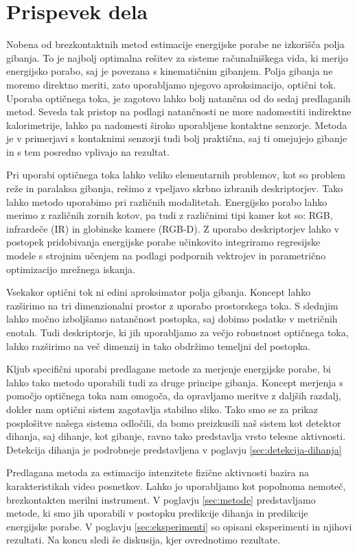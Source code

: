 \section{Prispevek dela}
Nobena od brezkontaktnih metod estimacije energijske porabe ne izkorišča polja gibanja. To je najbolj optimalna rešitev za sisteme računalniškega vida, ki merijo energijsko porabo, saj je povezana s kinematičnim gibanjem. Polja gibanja ne moremo direktno meriti, zato uporabljamo njegovo aproksimacijo, optični tok. Uporaba optičnega toka, je zagotovo lahko bolj natančna od do sedaj predlaganih metod. Seveda tak pristop na podlagi natančnosti ne more nadomestiti indirektne kalorimetrije, lahko pa nadomesti široko uporabljene kontaktne senzorje. Metoda je v primerjavi s kontaknimi senzorji tudi bolj praktična, saj ti omejujejo gibanje in s tem posredno vplivajo na rezultat. 

Pri uporabi optičnega toka lahko veliko elementarnih problemov, kot so problem reže in paralaksa gibanja, rešimo z vpeljavo skrbno izbranih deskriptorjev. Tako lahko metodo uporabimo pri različnih modalitetah. Energijsko porabo lahko merimo z različnih zornih kotov, pa tudi z različnimi tipi kamer kot so: RGB, infrardeče (IR) in globinske kamere (RGB-D). Z uporabo deskriptorjev lahko v postopek pridobivanja energijske porabe učinkovito integriramo regresijske modele s strojnim učenjem na podlagi podpornih vektrojev in parametrično optimizacijo mrežnega iskanja. 

Vsekakor optični tok ni edini aproksimator polja gibanja. Koncept lahko razširimo na tri dimenzionalni prostor z uporabo prostorskega toka. S slednjim lahko močno izboljšamo natančnost postopka, saj dobimo podatke v metričnih enotah. Tudi deskriptorje, ki jih uporabljamo za večjo robustnost optičnega toka, lahko razširimo na več dimenzij in tako obdržimo temeljni del postopka.

Kljub specifični uporabi predlagane metode za merjenje energijske porabe, bi lahko tako metodo uporabili tudi za druge principe gibanja. Koncept merjenja s pomočjo optičnega toka nam omogoča, da opravljamo meritve z daljših razdalj, dokler nam optični sistem zagotavlja stabilno sliko. Tako smo se za prikaz posplošitve našega sistema odločili, da bomo preizkusili naš sistem kot detektor dihanja, saj dihanje, kot gibanje, ravno tako predstavlja vrsto telesne aktivnosti. Detekcija dihanja je podrobneje predstavljena v poglavju \ref{sec:detekcija-dihanja}

Predlagana metoda za estimacijo intenzitete fizične aktivnosti bazira na karakteristikah video posnetkov. Lahko jo uporabljamo kot popolnoma nemoteč, brezkontakten merilni instrument. V poglavju \ref{sec:metode}  predstavljamo metode, ki smo jih uporabili v postopku predikcije dihanja in predikcije energijske porabe. V poglavju \ref{sec:eksperimenti} so opisani eksperimenti in njihovi rezultati. Na koncu sledi še diskusija, kjer ovrednotimo rezultate. 